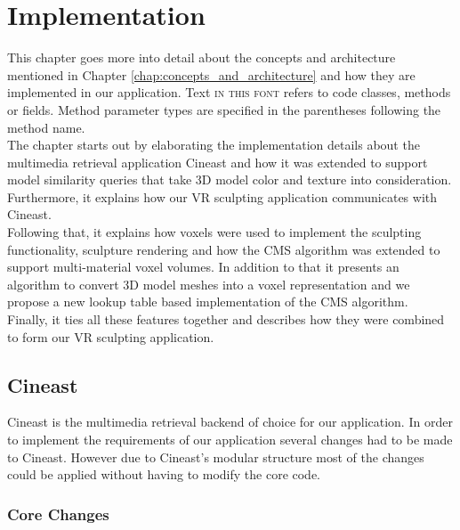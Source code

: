 \chapter{Implementation}

This chapter goes more into detail about the concepts and architecture mentioned in Chapter \ref{chap:concepts_and_architecture} and how they
are implemented in our application. Text \textsc{in this font} refers to code classes, methods or fields. Method parameter types are specified in the parentheses following the method name.\\
The chapter starts out by elaborating the implementation details about the multimedia retrieval application Cineast and how it was extended to support model similarity queries that take 3D model color and texture into consideration. Furthermore, it explains how our VR sculpting application communicates with Cineast.\\
Following that, it explains how voxels were used to implement the sculpting functionality, sculpture rendering and how the CMS algorithm was extended to support multi-material voxel volumes. In addition to that it presents an algorithm to
convert 3D model meshes into a voxel representation and we propose a new lookup table based implementation of the CMS algorithm.\\
Finally, it ties all these features together and describes how they were combined to form our VR sculpting application.

\section{Cineast}

Cineast is the multimedia retrieval backend of choice for our application. In order to implement the requirements of our application
several changes had to be made to Cineast. However due to Cineast's modular structure most of the changes could be applied without having to
modify the core code.


\subsection{Core Changes}
\label{sec:core_changes}

